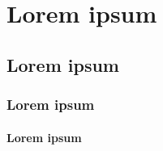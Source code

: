 
\chapter{Lorem ipsum} %
\label{cha:lorem_ipsum}

\blindtext

\section{Lorem ipsum} %
\label{sec:lorem_ipsum}

\blindtext

\subsection{Lorem ipsum} %
\label{sub:lorem_ipsum}

\blindtext

\subsubsection{Lorem ipsum} %
\label{ssub:lorem_ipsum}

\blindtext
